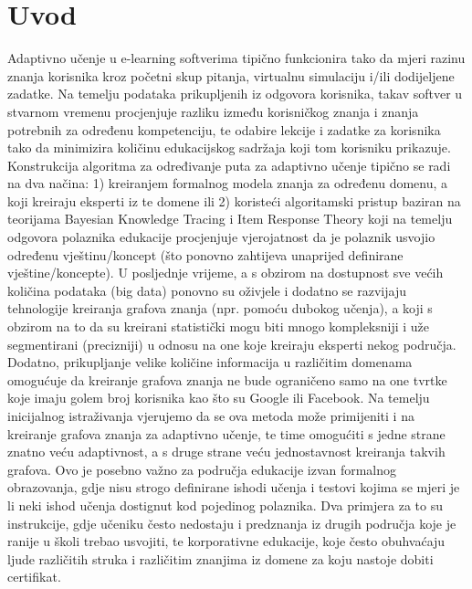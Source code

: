 \chapter{Uvod}
Adaptivno učenje u e-learning softverima tipično funkcionira tako da mjeri razinu znanja korisnika kroz početni skup pitanja, virtualnu simulaciju i/ili dodijeljene zadatke. Na temelju podataka prikupljenih iz odgovora korisnika, takav softver u stvarnom vremenu procjenjuje razliku između korisničkog znanja i znanja potrebnih za određenu kompetenciju, te odabire lekcije i zadatke za korisnika tako da minimizira količinu edukacijskog sadržaja koji tom korisniku prikazuje.\newline
Konstrukcija algoritma za određivanje puta za adaptivno učenje tipično se radi na dva načina: 1) kreiranjem formalnog modela znanja za određenu domenu, a koji kreiraju eksperti iz te domene ili 2) koristeći algoritamski pristup baziran na teorijama Bayesian Knowledge Tracing i Item Response Theory koji na temelju odgovora polaznika edukacije procjenjuje vjerojatnost da je polaznik usvojio određenu vještinu/koncept (što ponovno zahtijeva unaprijed definirane vještine/koncepte).\newline
U posljednje vrijeme, a s obzirom na dostupnost sve većih količina podataka (big data) ponovno su oživjele i dodatno se razvijaju tehnologije kreiranja grafova znanja (npr. pomoću dubokog učenja), a koji s obzirom na to da su kreirani statistički mogu biti mnogo kompleksniji i uže segmentirani (precizniji) u odnosu na one koje kreiraju eksperti nekog područja. Dodatno, prikupljanje velike količine informacija u različitim domenama omogućuje da kreiranje grafova znanja ne bude ograničeno samo na one tvrtke koje imaju golem broj korisnika kao što su Google ili Facebook. Na temelju inicijalnog istraživanja vjerujemo da se ova metoda može primijeniti i na kreiranje grafova znanja za adaptivno učenje, te time omogućiti s jedne strane znatno veću adaptivnost, a s druge strane veću jednostavnost kreiranja takvih grafova.\newline
Ovo je posebno važno za područja edukacije izvan formalnog obrazovanja, gdje nisu strogo definirane ishodi učenja i testovi kojima se mjeri je li neki ishod učenja dostignut kod pojedinog polaznika. Dva primjera za to su instrukcije, gdje učeniku često nedostaju i predznanja iz drugih područja koje je ranije u školi trebao usvojiti, te korporativne edukacije, koje često obuhvaćaju ljude različitih struka i različitim znanjima iz domene za koju nastoje dobiti certifikat.



